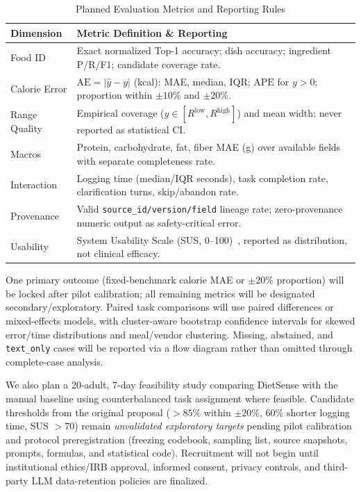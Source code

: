 \documentclass[conference]{IEEEtran}
\begin{document}
\begin{table}[t]
\centering
\caption{Planned Evaluation Metrics and Reporting Rules}
\label{tab:metrics}
\renewcommand{\arraystretch}{1.12}
\begin{tabularx}{\columnwidth}{@{}l X@{}}
\toprule
\textbf{Dimension} & \textbf{Metric Definition \& Reporting} \\
\midrule
Food ID & Exact normalized Top-1 accuracy; dish accuracy; ingredient P/R/F1; candidate coverage rate. \\
Calorie Error & $\text{AE} = |\hat{y} - y|$ (kcal): MAE, median, IQR; $\text{APE}$ for $y>0$; proportion within $\pm 10\%$ and $\pm 20\%$. \\
Range Quality & Empirical coverage ($y \in [R^{\text{low}}, R^{\text{high}}]$) and mean width; never reported as statistical CI. \\
Macros & Protein, carbohydrate, fat, fiber MAE (g) over available fields with separate completeness rate. \\
Interaction & Logging time (median/IQR seconds), task completion rate, clarification turns, skip/abandon rate. \\
Provenance & Valid \texttt{source\_id/version/field} lineage rate; zero-provenance numeric output as safety-critical error. \\
Usability & System Usability Scale (SUS, 0--100)~\cite{brooke1996sus}, reported as distribution, not clinical efficacy. \\
\bottomrule
\end{tabularx}
\end{table}

One primary outcome (fixed-benchmark calorie MAE or $\pm 20\%$ proportion) will be locked after pilot calibration; all remaining metrics will be designated secondary/exploratory. Paired task comparisons will use paired differences or mixed-effects models, with cluster-aware bootstrap confidence intervals for skewed error/time distributions and meal/vendor clustering. Missing, abstained, and \texttt{text\_only} cases will be reported via a flow diagram rather than omitted through complete-case analysis.

We also plan a 20-adult, 7-day feasibility study comparing DietSense with the manual baseline using counterbalanced task assignment where feasible. Candidate thresholds from the original proposal ($>85\%$ within $\pm 20\%$, 60\% shorter logging time, SUS $>70$) remain \emph{unvalidated exploratory targets} pending pilot calibration and protocol preregistration (freezing codebook, sampling list, source snapshots, prompts, formulas, and statistical code). Recruitment will not begin until institutional ethics/IRB approval, informed consent, privacy controls, and third-party LLM data-retention policies are finalized.
\end{document}

